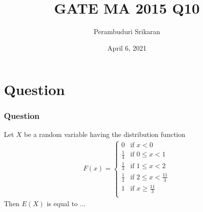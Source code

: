 \documentclass{beamer}
\title{GATE MA 2015 Q10}
\author{Perambuduri Srikaran}
\institute{IITH AI}
\date{April 6, 2021}
\begin{document}
\providecommand{\pr}[1]{\ensuremath{\Pr\left(#1\right)}}
\providecommand{\qfunc}[1]{\ensuremath{Q\left(#1\right)}}
\providecommand{\sbrak}[1]{\ensuremath{{}\left[#1\right]}}
\providecommand{\lsbrak}[1]{\ensuremath{{}\left[#1\right.}}
\providecommand{\rsbrak}[1]{\ensuremath{{}\left.#1\right]}}
\providecommand{\brak}[1]{\ensuremath{\left(#1\right)}}
\providecommand{\lbrak}[1]{\ensuremath{\left(#1\right.}}
\providecommand{\rbrak}[1]{\ensuremath{\left.#1\right)}}
\providecommand{\cbrak}[1]{\ensuremath{\left\{#1\right\}}}
\providecommand{\lcbrak}[1]{\ensuremath{\left\{#1\right.}}
\providecommand{\rcbrak}[1]{\ensuremath{\left.#1\right\}}}
\begin{frame}
\titlepage
\end{frame}
\section{Question}
\begin{frame}
\frametitle{Question}
\begin{block}{}
Let $X$ be a random variable having the distribution function
\begin{align}
F(x) = 
    \begin{cases} 
      0 & \text{if }x < 0 \\
      \frac{1}{4} & \text{if } 0\leq x < 1 \\
      \frac{1}{3} & \text{if } 1\leq x < 2 \\
      \frac{1}{2} & \text{if } 2\leq x < \frac{11}{3} \\
      1 & \text{if } x \geq \frac{11}{3} \\
   \end{cases}
\end{align}
Then $E(X)$ is equal to ...
\end{block}
\end{frame}
\end{document}
